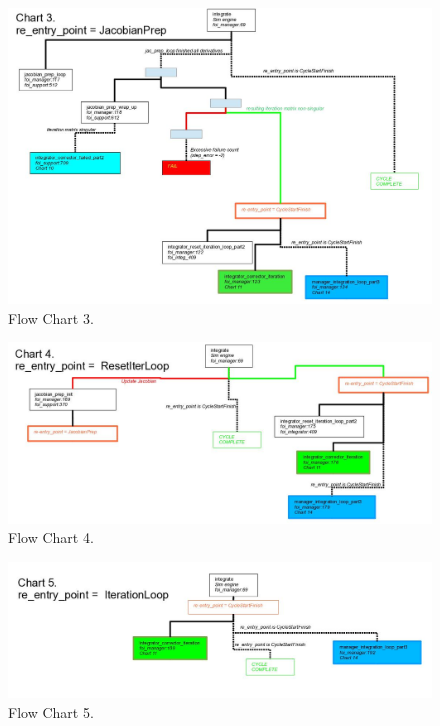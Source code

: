 \begin{figure}[htp]
\begin{center}
\includegraphics[width=6.5in]{figures/lsode_flow3.jpg}
\caption{Flow Chart 3.}
\end{center}
\end{figure}

\begin{figure}[htp]
\begin{center}
\includegraphics[width=6.5in]{figures/lsode_flow4.jpg}
\caption{Flow Chart 4.}
\end{center}
\end{figure}

\begin{figure}[htp]
\begin{center}
\includegraphics[width=6.5in]{figures/lsode_flow5.jpg}
\caption{Flow Chart 5.}
\end{center}
\end{figure}

